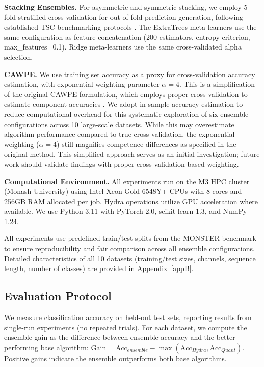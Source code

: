 \documentclass[pdflatex,sn-basic]{sn-jnl}           %
\theoremstyle{thmstyleone}%
\theoremstyle{thmstyletwo}%
\theoremstyle{thmstylethree}%
\begin{document}
\textbf{Stacking Ensembles.} For asymmetric and symmetric stacking, we employ 5-fold stratified cross-validation for out-of-fold prediction generation, following established TSC benchmarking protocols \citep{tsc-bakeoff}. The ExtraTrees meta-learners use the same configuration as feature concatenation (200 estimators, entropy criterion, max\_features=0.1). Ridge meta-learners use the same cross-validated alpha selection.

\textbf{CAWPE.} We use training set accuracy as a proxy for cross-validation accuracy estimation, with exponential weighting parameter $\alpha=4$. This is a simplification of the original CAWPE formulation, which employs proper cross-validation to estimate component accuracies \citep{cawpe}. We adopt in-sample accuracy estimation to reduce computational overhead for this systematic exploration of six ensemble configurations across 10 large-scale datasets. While this may overestimate algorithm performance compared to true cross-validation, the exponential weighting ($\alpha=4$) still magnifies competence differences as specified in the original method. This simplified approach serves as an initial investigation; future work should validate findings with proper cross-validation-based weighting.

\textbf{Computational Environment.} All experiments run on the M3 HPC cluster (Monash University) using Intel Xeon Gold 6548Y+ CPUs with 8 cores and 256GB RAM allocated per job. Hydra operations utilize GPU acceleration where available. We use Python 3.11 with PyTorch 2.0, scikit-learn 1.3, and NumPy 1.24.

All experiments use predefined train/test splits from the MONSTER benchmark to ensure reproducibility and fair comparison across all ensemble configurations. Detailed characteristics of all 10 datasets (training/test sizes, channels, sequence length, number of classes) are provided in Appendix~\ref{appB}.

\subsection{Evaluation Protocol}

We measure classification accuracy on held-out test sets, reporting results from single-run experiments (no repeated trials). For each dataset, we compute the ensemble gain as the difference between ensemble accuracy and the better-performing base algorithm: $\text{Gain} = \text{Acc}_{ensemble} - \max(\text{Acc}_{Hydra}, \text{Acc}_{Quant})$. Positive gains indicate the ensemble outperforms both base algorithms.
\end{document}
